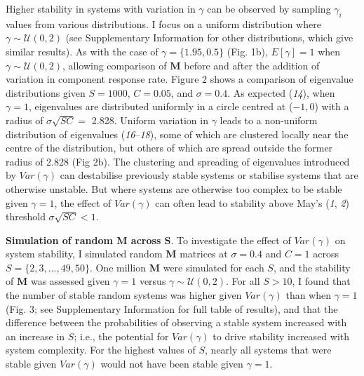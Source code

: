 \documentclass[]{article}
\begin{document}
Higher stability in systems with variation in \(\gamma\) can be observed
by sampling \(\gamma_{i}\) values from various distributions. I focus on
a uniform distribution where \(\gamma \sim \mathcal{U}(0, 2)\) (see
Supplementary Information for other distributions, which give similar
results). As with the case of \(\gamma = \{1.95, 0.5\}\) (Fig. 1b),
\(E[\gamma] = 1\) when \(\gamma \sim \mathcal{U}(0, 2)\), allowing
comparison of \(\mathbf{M}\) before and after the addition of variation
in component response rate. Figure 2 shows a comparison of eigenvalue
distributions given \(S = 1000\), \(C = 0.05\), and \(\sigma = 0.4\). As
expected (\emph{14}), when \(\gamma = 1\), eigenvalues are distributed
uniformly in a circle centred at (\(-1, 0\)) with a radius of
\(\sigma\sqrt{SC} =\) 2.828. Uniform variation in \(\gamma\) leads to a
non-uniform distribution of eigenvalues (\emph{16}--\emph{18}), some of
which are clustered locally near the centre of the distribution, but
others of which are spread outside the former radius of 2.828 (Fig 2b).
The clustering and spreading of eigenvalues introduced by
\(Var(\gamma)\) can destabilise previously stable systems or stabilise
systems that are otherwise unstable. But where systems are otherwise too
complex to be stable given \(\gamma = 1\), the effect of \(Var(\gamma)\)
can often lead to stability above May's (\emph{1}, \emph{2}) threshold
\(\sigma\sqrt{SC} < 1\).

\textbf{Simulation of random \(\mathbf{M}\) across \(\mathbf{S}\)}. To
investigate the effect of \(Var(\gamma)\) on system stability, I
simulated random \(\mathbf{M}\) matrices at \(\sigma = 0.4\) and
\(C = 1\) across \(S = \{2, 3, ..., 49, 50\}\). One million
\(\mathbf{M}\) were simulated for each \(S\), and the stability of
\(\mathbf{M}\) was assessed given \(\gamma = 1\) versus
\(\gamma \sim \mathcal{U}(0, 2)\). For all \(S > 10\), I found that the
number of stable random systems was higher given \(Var(\gamma)\) than
when \(\gamma = 1\) (Fig. 3; see Supplementary Information for full
table of results), and that the difference between the probabilities of
observing a stable system increased with an increase in \(S\); i.e., the
potential for \(Var(\gamma)\) to drive stability increased with system
complexity. For the highest values of \(S\), nearly all systems that
were stable given \(Var(\gamma)\) would not have been stable given
\(\gamma = 1\).
\end{document}
